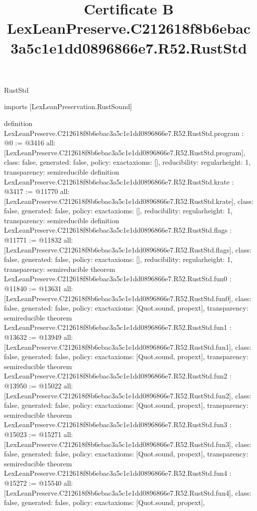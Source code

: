 \begin{lexlean}{RustStd}
\title{Certificate B LexLeanPreserve.C212618f8b6ebac3a5c1e1dd0896866e7.R52.RustStd}
\begin{coremodule}
imports [LexLeanPreservation.RustSound]

definition LexLeanPreserve.C212618f8b6ebac3a5c1e1dd0896866e7.R52.RustStd.program : @0 := @3416 {
  all: [LexLeanPreserve.C212618f8b6ebac3a5c1e1dd0896866e7.R52.RustStd.program],
  class: false,
  generated: false,
  policy: exact{axioms: []},
  reducibility: regular{height: 1},
  transparency: semireducible
}
definition LexLeanPreserve.C212618f8b6ebac3a5c1e1dd0896866e7.R52.RustStd.krate : @3417 := @11770 {
  all: [LexLeanPreserve.C212618f8b6ebac3a5c1e1dd0896866e7.R52.RustStd.krate],
  class: false,
  generated: false,
  policy: exact{axioms: []},
  reducibility: regular{height: 1},
  transparency: semireducible
}
definition LexLeanPreserve.C212618f8b6ebac3a5c1e1dd0896866e7.R52.RustStd.flags : @11771 := @11832 {
  all: [LexLeanPreserve.C212618f8b6ebac3a5c1e1dd0896866e7.R52.RustStd.flags],
  class: false,
  generated: false,
  policy: exact{axioms: []},
  reducibility: regular{height: 1},
  transparency: semireducible
}
theorem LexLeanPreserve.C212618f8b6ebac3a5c1e1dd0896866e7.R52.RustStd.fun0 : @11840 := @13631 {
  all: [LexLeanPreserve.C212618f8b6ebac3a5c1e1dd0896866e7.R52.RustStd.fun0],
  class: false,
  generated: false,
  policy: exact{axioms: [Quot.sound, propext]},
  transparency: semireducible
}
theorem LexLeanPreserve.C212618f8b6ebac3a5c1e1dd0896866e7.R52.RustStd.fun1 : @13632 := @13949 {
  all: [LexLeanPreserve.C212618f8b6ebac3a5c1e1dd0896866e7.R52.RustStd.fun1],
  class: false,
  generated: false,
  policy: exact{axioms: [Quot.sound, propext]},
  transparency: semireducible
}
theorem LexLeanPreserve.C212618f8b6ebac3a5c1e1dd0896866e7.R52.RustStd.fun2 : @13950 := @15022 {
  all: [LexLeanPreserve.C212618f8b6ebac3a5c1e1dd0896866e7.R52.RustStd.fun2],
  class: false,
  generated: false,
  policy: exact{axioms: [Quot.sound, propext]},
  transparency: semireducible
}
theorem LexLeanPreserve.C212618f8b6ebac3a5c1e1dd0896866e7.R52.RustStd.fun3 : @15023 := @15271 {
  all: [LexLeanPreserve.C212618f8b6ebac3a5c1e1dd0896866e7.R52.RustStd.fun3],
  class: false,
  generated: false,
  policy: exact{axioms: [Quot.sound, propext]},
  transparency: semireducible
}
theorem LexLeanPreserve.C212618f8b6ebac3a5c1e1dd0896866e7.R52.RustStd.fun4 : @15272 := @15540 {
  all: [LexLeanPreserve.C212618f8b6ebac3a5c1e1dd0896866e7.R52.RustStd.fun4],
  class: false,
  generated: false,
  policy: exact{axioms: [Quot.sound, propext]},
}
\end{coremodule}
\end{lexlean}
